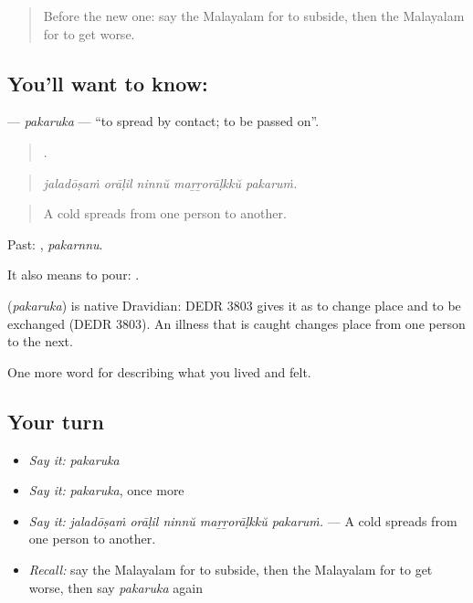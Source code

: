 \label{lesson:ML-C541-pakaruka}



\begin{quote}
Before the new one: say the Malayalam for to subside, then the Malayalam for to get worse.
\end{quote}

\subsection*{You'll want to know: }
\textbf{} — \emph{pakaruka} — \textquotedblleft{}to spread by contact; to be passed on\textquotedblright{}.

\begin{quote}
    .
\end{quote}

\begin{quote}
\emph{jaladōṣaṁ orāḷil ninnŭ maṟṟorāḷkkŭ pakaruṁ.}
\end{quote}

\begin{quote}
A cold spreads from one person to another.
\end{quote}

Past: , \emph{pakarnnu}.

It also means to pour:    .

\begin{cousinweb}
\textbf{} (\emph{pakaruka}) is native Dravidian: DEDR 3803 gives it as to change place and to be exchanged (DEDR 3803). An illness that is caught changes place from one person to the next.
\end{cousinweb}

\begin{grammarlens}[title={What you've built}]
One more word for describing what you lived and felt.
\end{grammarlens}

\subsection*{Your turn}
\begin{itemize}
\raggedright
  \item \emph{Say it:} \emph{pakaruka}
  \item \emph{Say it:} \emph{pakaruka}, once more
  \item \emph{Say it:} \emph{jaladōṣaṁ orāḷil ninnŭ maṟṟorāḷkkŭ pakaruṁ.} — A cold spreads from one person to another.
  \item \emph{Recall:} say the Malayalam for to subside, then the Malayalam for to get worse, then say \emph{pakaruka} again
\end{itemize}

